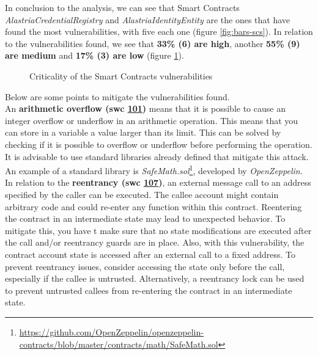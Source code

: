 In conclusion to the analysis, we can see that Smart Contracts \textit{AlastriaCredentialRegistry} and \textit{AlastriaIdentityEntity} are the ones that have found the most vulnerabilities, with five each one (figure \ref{fig:bars-scs}). In relation to the vulnerabilities found, we see that \textbf{33\% (6) are high}, another \textbf{55\% (9) are medium} and \textbf{17\% (3) are low} (figure \ref{fig:pie-scs}).\\
\begin{figure}[h!]
    \centering
    \caption{Criticality of the Smart Contracts vulnerabilities}
    \label{fig:pie-scs}
\end{figure}

Below are some points to mitigate the vulnerabilities found.\\

An \textbf{arithmetic overflow (\acrshort{swc} \href{https://swcregistry.io/docs/SWC-101}{101})} means that it is possible to cause an integer overflow or underflow in an arithmetic operation. This means that you can store in a variable a value larger than its limit. This can be solved by checking if it is possible to overflow or underflow before performing the operation. It is advisable to use standard libraries already defined that mitigate this attack. An example of a standard library is \textit{SafeMath.sol}\footnote{\url{https://github.com/OpenZeppelin/openzeppelin-contracts/blob/master/contracts/math/SafeMath.sol}}, developed by \textit{OpenZeppelin}.\\

In relation to the \textbf{reentrancy (\acrshort{swc} \href{https://swcregistry.io/docs/SWC-107}{107})}, an external message call to an address specified by the caller can be executed. The callee account might contain arbitrary code and could re-enter any function within this contract. Reentering the contract in an intermediate state may lead to unexpected behavior. To mitigate this, you have t make sure that no state modifications are executed after the call and/or reentrancy guards are in place. Also, with this vulnerability, the contract account state is accessed after an external call to a fixed address. To prevent reentrancy issues, consider accessing the state only before the call, especially if the callee is untrusted. Alternatively, a reentrancy lock can be used to prevent untrusted callees from re-entering the contract in an intermediate state.\\

